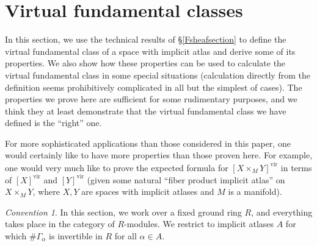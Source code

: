 \documentclass[12pt]{article}
\theoremstyle{definition}
\theoremstyle{remark}
\newtheorem{convention}[theorem]{Convention}
\numberwithin{equation}{subsection}
\newcommand{\vir}{\mathrm{vir}}
\begin{document}
\section{Virtual fundamental classes}\label{fundamentalclasssection}

In this section, we use the technical results of \S\ref{Fsheafsection} to define the virtual fundamental class of a space with implicit atlas and derive some of its properties.  We also show how these properties can be used to calculate the virtual fundamental class in some special situations (calculation directly from the definition seems prohibitively complicated in all but the simplest of cases).  The properties we prove here are sufficient for some rudimentary purposes, and we think they at least demonstrate that the virtual fundamental class we have defined is the ``right'' one.

For more sophisticated applications than those considered in this paper, one would certainly like to have more properties than those proven here.  For example, one would very much like to prove the expected formula for $[X\times_MY]^\vir$ in terms of $[X]^\vir$ and $[Y]^\vir$ (given some natural ``fiber product implicit atlas'' on $X\times_MY$, where $X,Y$ are spaces with implicit atlases and $M$ is a manifold).

\begin{convention}
In this section, we work over a fixed ground ring $R$, and everything takes place in the category of $R$-modules.  We restrict to implicit atlases $A$ for which $\#\Gamma_\alpha$ is invertible in $R$ for all $\alpha\in A$.
\end{convention}
\end{document}
